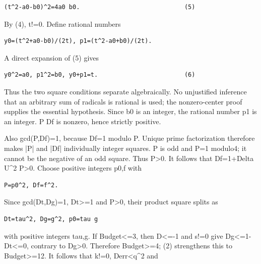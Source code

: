 \begin{verbatim}
(t^2-a0-b0)^2=4a0 b0.                             (5)
\end{verbatim}

By (4), t!=\allowbreak{}0. Define rational numbers



\begin{verbatim}
y0=(t^2+a0-b0)/(2t), p1=(t^2-a0+b0)/(2t).
\end{verbatim}

A direct expansion of (5) gives



\begin{verbatim}
y0^2=a0, p1^2=b0, y0+p1=t.                        (6)
\end{verbatim}

Thus the two square conditions separate algebraically. No unjustified inference that an arbitrary sum of radicals is rational is used; the nonzero-center proof supplies the essential hypothesis. Since b0 is an integer, the rational number p1 is an integer. P Df is nonzero, hence strictly positive.



Also gcd(P,Df)=\allowbreak{}1, because Df=\allowbreak{}1 modulo P. Unique prime factorization therefore makes |P| and |Df| individually integer squares. P is odd and P=\allowbreak{}1 modulo4; it cannot be the negative of an odd square. Thus P\textgreater{}\allowbreak{}0. It follows that Df=\allowbreak{}1+\allowbreak{}Delta U\textasciicircum{}\allowbreak{}2 P\textgreater{}\allowbreak{}0. Choose positive integers p0,f with



\begin{verbatim}
P=p0^2, Df=f^2.
\end{verbatim}

Since gcd(Dt,Dg)=\allowbreak{}1, Dt\textgreater{}\allowbreak{}=\allowbreak{}1 and P\textgreater{}\allowbreak{}0, their product square splits as



\begin{verbatim}
Dt=tau^2, Dg=g^2, p0=tau g
\end{verbatim}

with positive integers tau,g. If Budget\textless{}\allowbreak{}=\allowbreak{}3, then D\textless{}\allowbreak{}=\allowbreak{}-1 and s!=\allowbreak{}0 give Dg\textless{}\allowbreak{}=\allowbreak{}1-Dt\textless{}\allowbreak{}=\allowbreak{}0, contrary to Dg\textgreater{}\allowbreak{}0. Therefore Budget\textgreater{}\allowbreak{}=\allowbreak{}4; (2) strengthens this to Budget\textgreater{}\allowbreak{}=\allowbreak{}12. It follows that k!=\allowbreak{}0, Derr\textless{}\allowbreak{}q\textasciicircum{}\allowbreak{}2 and




